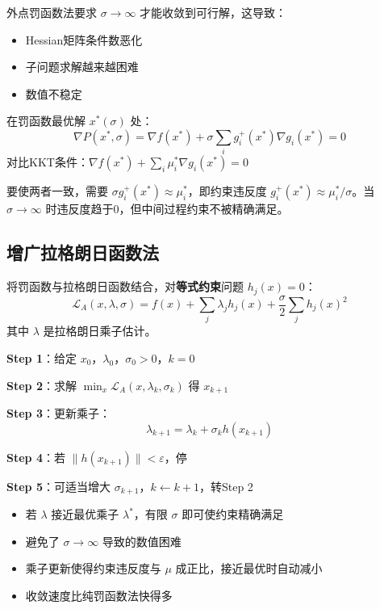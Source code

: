 外点罚函数法要求 $\sigma \to \infty$ 才能收敛到可行解，这导致：
\begin{itemize}
    \item Hessian矩阵条件数恶化
    \item 子问题求解越来越困难
    \item 数值不稳定
\end{itemize}

\begin{notebox}[关键观察]
在罚函数最优解 $x^*(\sigma)$ 处：
\[
\nabla P(x^*, \sigma) = \nabla f(x^*) + \sigma \sum_{i} g_i^+(x^*) \nabla g_i(x^*) = 0
\]
对比KKT条件：$\nabla f(x^*) + \sum_i \mu_i^* \nabla g_i(x^*) = 0$

要使两者一致，需要 $\sigma g_i^+(x^*) \approx \mu_i^*$，即约束违反度 $g_i^+(x^*) \approx \mu_i^*/\sigma$。当 $\sigma \to \infty$ 时违反度趋于0，但中间过程约束不被精确满足。
\end{notebox}

\subsection{增广拉格朗日函数法}

\begin{conceptbox}[增广拉格朗日函数]
将罚函数与拉格朗日函数结合，对\textbf{等式约束}问题 $h_j(x) = 0$：
\[
\mathcal{L}_A(x, \lambda, \sigma) = f(x) + \sum_j \lambda_j h_j(x) + \frac{\sigma}{2}\sum_j h_j(x)^2
\]
其中 $\lambda$ 是拉格朗日乘子估计。
\end{conceptbox}

\begin{algobox}
\textbf{Step 1}：给定 $x_0$，$\lambda_0$，$\sigma_0 > 0$，$k = 0$

\textbf{Step 2}：求解 $\min_x \mathcal{L}_A(x, \lambda_k, \sigma_k)$ 得 $x_{k+1}$

\textbf{Step 3}：更新乘子：
\[
\lambda_{k+1} = \lambda_k + \sigma_k h(x_{k+1})
\]

\textbf{Step 4}：若 $\|h(x_{k+1})\| < \varepsilon$，停

\textbf{Step 5}：可适当增大 $\sigma_{k+1}$，$k \leftarrow k+1$，转Step 2
\end{algobox}

\begin{notebox}[增广拉格朗日法的优势]
\begin{itemize}[itemsep=0.3em]
    \item 若 $\lambda$ 接近最优乘子 $\lambda^*$，有限 $\sigma$ 即可使约束精确满足
    \item 避免了 $\sigma \to \infty$ 导致的数值困难
    \item 乘子更新使得约束违反度与 $\mu$ 成正比，接近最优时自动减小
    \item 收敛速度比纯罚函数法快得多
\end{itemize}
\end{notebox}

